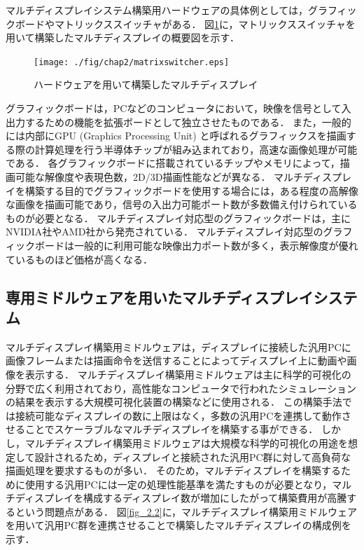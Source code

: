 マルチディスプレイシステム構築用ハードウェアの具体例としては，グラフィックボードやマトリックススイッチャがある．
図\ref{fig_2.1}に，マトリックススイッチャを用いて構築したマルチディスプレイの概要図を示す．

\begin{figure}[htbp]
 \texttt{[image: ./fig/chap2/matrixswitcher.eps]}
 \caption{ハードウェアを用いて構築したマルチディスプレイ}
 \label{fig_2.1}
\end{figure}

グラフィックボードは，PCなどのコンピュータにおいて，映像を信号として入出力するための機能を拡張ボードとして独立させたものである．
また，一般的には内部にGPU (Graphics Processing Unit) と呼ばれるグラフィックスを描画する際の計算処理を行う半導体チップが組み込まれており，高速な画像処理が可能である．
各グラフィックボードに搭載されているチップやメモリによって，描画可能な解像度や表現色数，2D/3D描画性能などが異なる．
マルチディスプレイを構築する目的でグラフィックボードを使用する場合には，ある程度の高解像な画像を描画可能であり，信号の入出力可能ポート数が多数備え付けられているものが必要となる．
マルチディスプレイ対応型のグラフィックボードは，主にNVIDIA社やAMD社から発売されている．
マルチディスプレイ対応型のグラフィックボードは一般的に利用可能な映像出力ポート数が多く，表示解像度が優れているものほど価格が高くなる．

\subsection*{専用ミドルウェアを用いたマルチディスプレイシステム}

マルチディスプレイ構築用ミドルウェアは，ディスプレイに接続した汎用PCに画像フレームまたは描画命令を送信することによってディスプレイ上に動画や画像を表示する．
マルチディスプレイ構築用ミドルウェアは主に科学的可視化の分野で広く利用されており，高性能なコンピュータで行われたシミュレーションの結果を表示する大規模可視化装置の構築などに使用される．
この構築手法では接続可能なディスプレイの数に上限はなく，多数の汎用PCを連携して動作させることでスケーラブルなマルチディスプレイを構築する事ができる．
しかし，マルチディスプレイ構築用ミドルウェアは大規模な科学的可視化の用途を想定して設計されるため，ディスプレイと接続された汎用PC群に対して高負荷な描画処理を要求するものが多い．
そのため，マルチディスプレイを構築するために使用する汎用PCには一定の処理性能基準を満たすものが必要となり，マルチディスプレイを構成するディスプレイ数が増加にしたがって構築費用が高騰するという問題点がある．
図\ref{fig_2.2}に，マルチディスプレイ構築用ミドルウェアを用いて汎用PC群を連携させることで構築したマルチディスプレイの構成例を示す．

